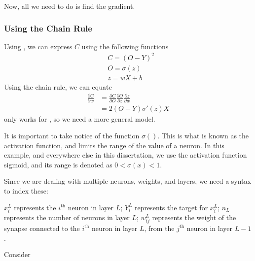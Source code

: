Now, all we need to do is find the gradient.

\subsubsection{Using the Chain Rule}
\label{chain}

Using , we can express $C$ using the following functions 
\begin{equation}
\begin{split}
&C=(O-Y)^2\\
&O=\sigma(z)\\
&z=wX+b
\end{split}
\end{equation}
Using the chain rule, we can equate
\begin{equation}
\begin{split}
\frac{\partial C}{\partial w}&=\frac{\partial C}{\partial O}\frac{\partial O}{\partial z}\frac{\partial z}{\partial w}\\
&=2(O-Y)\sigma'(z)X
\label{eq:crw}
\end{split}
\end{equation}
 only works for , so we need a more general \gls{model}.

It is important to take notice of the function $\sigma()$. This is what is known as the \gls{activation} function, and limits the range of the value of a neuron. In this example, and everywhere else in this dissertation, we use the activation function sigmoid, and its range is denoted as $0<\sigma(x)<1$.

Since we are dealing with multiple \gls{neuron}s, weights, and \gls{layer}s, we need a syntax to index these:

$x^L_i$ represents the $i^\text{th}$ \gls{neuron} in \gls{layer} $L$;
$Y^L_i$ represents the target for $x^L_i$;
$n_L$ represents the number of \gls{neuron}s in \gls{layer} $L$;
$w^L_{ij}$ represents the weight of the \gls{synapse} connected to the $i^\text{th}$ \gls{neuron} in \gls{layer} $L$, from the $j^\text{th}$ \gls{neuron} in \gls{layer} $L-1$. 

Consider 

